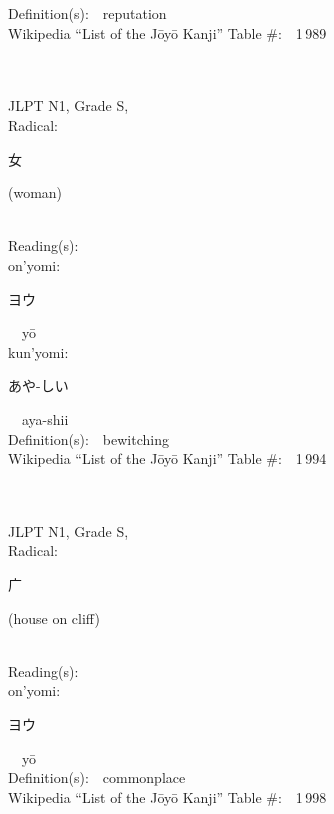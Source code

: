 \begin{multicols}{2}
Definition(s):\ \ reputation \\
Wikipedia ``List of the J\=oy\=o Kanji'' Table \#:\ \ 1\,989 \\
\ \ \\
{\fontsize{34pt}{40pt}  }\ \ \\
{JLPT N1, Grade S, \\Radical:\ \ {\begin{CJK}{UTF8}{min} 女 \end{CJK}} (woman) } \\
Reading(s):\ \ \\
{\hspace*{1em}}on'yomi:\ \ \\
{\hspace*{2em}}{\begin{CJK}{UTF8}{min} ヨウ \end{CJK}}\ \ y\=o\ \ \\
{\hspace*{1em}}kun'yomi:\ \ \\
{\hspace*{2em}}{\begin{CJK}{UTF8}{min} あや-しい \end{CJK}}\ \ aya-shii\ \ \\
Definition(s):\ \ bewitching \\
Wikipedia ``List of the J\=oy\=o Kanji'' Table \#:\ \ 1\,994 \\
\ \ \\
{\fontsize{34pt}{40pt}  }\ \ \\
{JLPT N1, Grade S, \\Radical:\ \ {\begin{CJK}{UTF8}{min} 广 \end{CJK}} (house on cliff) } \\
Reading(s):\ \ \\
{\hspace*{1em}}on'yomi:\ \ \\
{\hspace*{2em}}{\begin{CJK}{UTF8}{min} ヨウ \end{CJK}}\ \ y\=o\ \ \\
Definition(s):\ \ commonplace \\
Wikipedia ``List of the J\=oy\=o Kanji'' Table \#:\ \ 1\,998 \\

\end{multicols}
